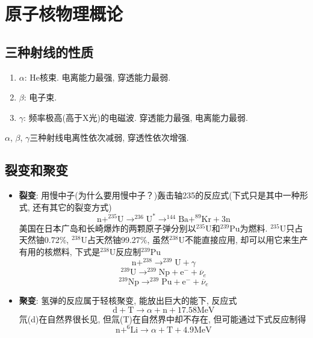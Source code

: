 \section{原子核物理概论}
\subsection{三种射线的性质}
\begin{enumerate}
\item $\alpha$: He核束. 电离能力最强, 穿透能力最弱. 
\item $\beta$: 电子束. 
\item $\gamma$: 频率极高(高于X光)的电磁波. 穿透能力最强, 电离能力最弱. 
\end{enumerate}
$\alpha$, $\beta$, $\gamma$三种射线电离性依次减弱, 穿透性依次增强. 

\subsection{裂变和聚变}
\begin{itemize}
\item \textbf{裂变}: 用慢中子(为什么要用慢中子？)轰击轴235的反应式(下式只是其中一种形式, 还有其它的裂变方式)
\[
\textrm{n}+^{235}\textrm{U}\longrightarrow^{236}\textrm{U}^*\longrightarrow^{144}\textrm{Ba}+^{89}\textrm{Kr}+3\textrm{n}
\]
美国在日本广岛和长崎爆炸的两颗原子弹分别以$^{235}\textrm{U}$和$^{239}\textrm{Pu}$为燃料. 
$^{235}\textrm{U}$只占天然铀0.72\%, $^{238}\textrm{U}$占天然铀99.27\%, 
虽然$^{238}\textrm{U}$不能直接应用, 却可以用它来生产有用的核燃料, 下式是$^{238}\textrm{U}$反应制$^{239}\textrm{Pu}$
\[
\textrm{n}+^{238}\longrightarrow^{239}\textrm{U}+\gamma
\]
\[
^{239}\textrm{U}\longrightarrow^{239}\textrm{Np}+\textrm{e}^-+\overline{\nu}_e
\]
\[
^{239}\textrm{Np}\longrightarrow^{239}\textrm{Pu}+\textrm{e}^-+\overline{\nu}_e
\]
\item \textbf{聚变}: 氢弹的反应属于轻核聚变, 能放出巨大的能下, 反应式
\[
\textrm{d}+\textrm{T}\longrightarrow\alpha+\textrm{n}+17.58\textrm{MeV}
\]
氘(d)在自然界很长见, 但氚(T)在自然界中却不存在, 但可能通过下式反应制得
\[
\textrm{n}+^6\textrm{Li}\longrightarrow\alpha+\textrm{T}+4.9\textrm{MeV}
\]
\end{itemize}
